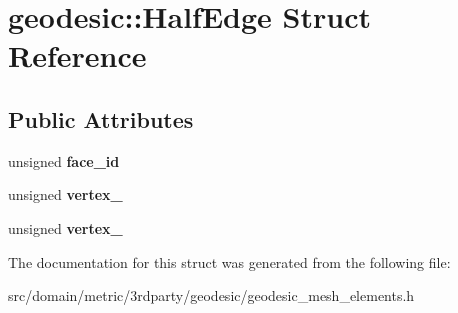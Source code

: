 \hypertarget{structgeodesic_1_1_half_edge}{}\section{geodesic\+:\+:Half\+Edge Struct Reference}
\label{structgeodesic_1_1_half_edge}
\subsection*{Public Attributes}
\begin{DoxyCompactItemize}
\item 
\hypertarget{structgeodesic_1_1_half_edge_a82a852c100d5a90b002d5b111c97c31e}{}unsigned {\bfseries face\+\_\+id}\label{structgeodesic_1_1_half_edge_a82a852c100d5a90b002d5b111c97c31e}

\item 
\hypertarget{structgeodesic_1_1_half_edge_ae94938b088eb133f9073bb81a58665dd}{}unsigned {\bfseries vertex\+\_}\label{structgeodesic_1_1_half_edge_ae94938b088eb133f9073bb81a58665dd}

\item 
\hypertarget{structgeodesic_1_1_half_edge_a5cae2651ffb17ca758174c740f56a1d6}{}unsigned {\bfseries vertex\+\_}\label{structgeodesic_1_1_half_edge_a5cae2651ffb17ca758174c740f56a1d6}

\end{DoxyCompactItemize}


The documentation for this struct was generated from the following file\+:\begin{DoxyCompactItemize}
\item 
src/domain/metric/3rdparty/geodesic/geodesic\+\_\+mesh\+\_\+elements.\+h\end{DoxyCompactItemize}
